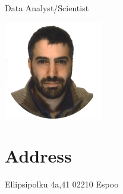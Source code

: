 \documentclass[]{friggeri-cv}
\begin{document}
      {Data Analyst/Scientist}
      

\begin{aside}
\includegraphics[scale=0.65]{img/foto.png}
  \section{Address}
    Ellipsipolku 4a,41
     02210 Espoo
    ~

\end{aside}
\end{document}
